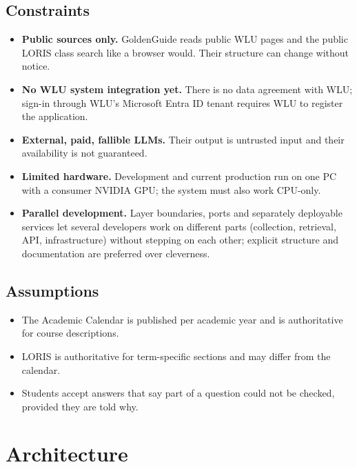 \documentclass[11pt,letterpaper]{report}
\begin{document}
\section{Constraints}
\begin{itemize}
  \item \textbf{Public sources only.} GoldenGuide reads public WLU pages and the public LORIS class
        search like a browser would. Their structure can change without notice.
  \item \textbf{No WLU system integration yet.} There is no data agreement with WLU; sign-in through
        WLU's Microsoft Entra ID tenant requires WLU to register the application.
  \item \textbf{External, paid, fallible LLMs.} Their output is untrusted input and their availability
        is not guaranteed.
  \item \textbf{Limited hardware.} Development and current production run on one PC with a consumer
        NVIDIA GPU; the system must also work CPU-only.
  \item \textbf{Parallel development.} Layer boundaries, ports and separately deployable services
        let several developers work on different parts (collection, retrieval, API, infrastructure)
        without stepping on each other; explicit structure and documentation are preferred over
        cleverness.
\end{itemize}

\section{Assumptions}
\begin{itemize}
  \item The Academic Calendar is published per academic year and is authoritative for course descriptions.
  \item LORIS is authoritative for term-specific sections and may differ from the calendar.
  \item Students accept answers that say part of a question could not be checked, provided they are told why.
\end{itemize}

\chapter{Architecture}\label{ch:architecture}
\end{document}
